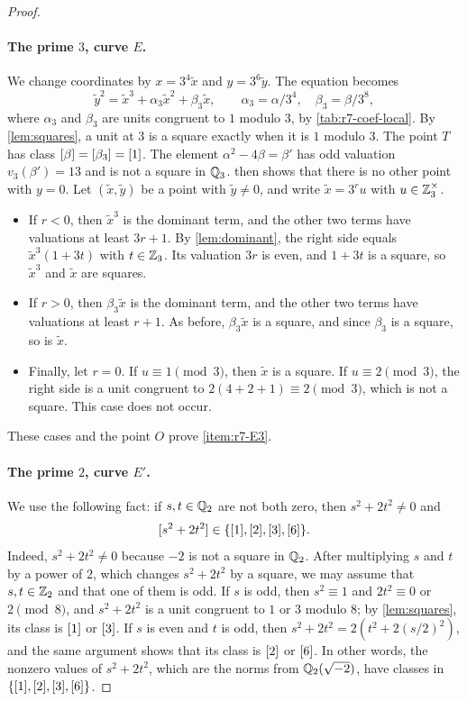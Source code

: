 \begin{proof}
\paragraph{The prime $3$, curve $E$.}
We change coordinates by $x=3^4\tilde x$ and $y=3^6\tilde y$. The equation becomes
\[
 \tilde y^2=\tilde x^3+\alpha_3\tilde x^2+\beta_3\tilde x,\qquad \alpha_3=\alpha/3^4,\quad
 \beta_3=\beta/3^8,
\]
where $\alpha_3$ and $\beta_3$ are units congruent to $1$ modulo $3$, by
\cref{tab:r7-coef-local}. By \cref{lem:squares}, a unit at $3$ is a square
exactly when it is $1$ modulo $3$. The point $T$ has class
$[\beta]=[\beta_3]=[1]$. The element $\alpha^2-4\beta=\beta'$ has odd
valuation $v_3(\beta')=13$ and is not a square in $\mathbb Q_3$.
 then shows that there is no other point with
$y=0$. Let
$(\tilde x,\tilde y)$ be a point with $\tilde y\ne0$, and write $\tilde x=3^ru$ with
$u\in\mathbb Z_3^\times$.
\begin{itemize}
\item If $r<0$, then $\tilde x^3$ is the dominant term, and the other two terms
have valuations at least $3r+1$. By \cref{lem:dominant}, the right side
equals $\tilde x^3(1+3t)$ with $t\in\mathbb Z_3$. Its valuation $3r$ is even, and
$1+3t$ is a square, so $\tilde x^3$ and $\tilde x$ are squares.
\item If $r>0$, then $\beta_3\tilde x$ is the dominant term, and the other two
terms have valuations at least $r+1$. As before, $\beta_3\tilde x$ is a square, and
since $\beta_3$ is a square, so is $\tilde x$.
\item Finally, let $r=0$. If $u\equiv1\pmod3$, then $\tilde x$ is a square. If
$u\equiv2\pmod3$, the right side is a unit congruent to
$2(4+2+1)\equiv2\pmod3$, which is not a square. This case does not occur.
\end{itemize}
These cases and the point $O$ prove \ref{item:r7-E3}.

\paragraph{The prime $2$, curve $E'$.}
We use the following fact: if $s,t\in\mathbb Q_2$ are not both zero, then
$s^2+2t^2\ne0$ and
\begin{equation}\label{r7:norm-classes}
 [s^2+2t^2]\in\{[1],[2],[3],[6]\}.
\end{equation}
Indeed, $s^2+2t^2\ne0$ because $-2$ is not a square in $\mathbb Q_2$. After
multiplying $s$ and $t$ by a power of $2$, which changes $s^2+2t^2$ by a
square, we may assume that $s,t\in\mathbb Z_2$ and that one of them is odd. If $s$ is odd, then
$s^2\equiv1$ and $2t^2\equiv0$ or $2\pmod8$, and $s^2+2t^2$ is a unit
congruent to $1$ or $3$ modulo $8$; by \cref{lem:squares}, its class is
$[1]$ or $[3]$. If $s$ is even and $t$ is odd, then
$s^2+2t^2=2(t^2+2(s/2)^2)$, and the same argument shows that its class is
$[2]$ or $[6]$. In other words, the nonzero values of $s^2+2t^2$, which
are the norms from $\mathbb Q_2(\sqrt{-2})$, have classes in
$\{[1],[2],[3],[6]\}$.


\end{proof}

